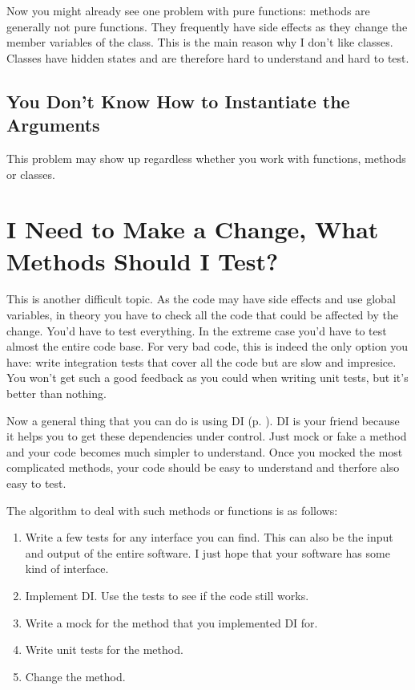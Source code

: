 Now you might already see one problem with pure functions: methods are generally not pure functions. They frequently have side effects as they change the member variables of the class. This is the main reason why I don't like classes. Classes have hidden states and are therefore hard to understand and hard to test.

\section{You Don't Know How to Instantiate the Arguments}

This problem may show up regardless whether you work with functions, methods or classes. 

\chapter{I Need to Make a Change, What Methods Should I Test?}

This is another difficult topic. As the code may have side effects and use global variables, in theory you have to check all the code that could be affected by the change. You'd have to test everything. In the extreme case you'd have to test almost the entire code base. For very bad code, this is indeed the only option you have: write integration tests that cover all the code but are slow and impresice. You won't get such a good feedback as you could when writing unit tests, but it's better than nothing.

Now a general thing that you can do is using DI (p. \pageref{sec:dependency_injection}). DI is your friend because it helps you to get these dependencies under control. Just mock or fake a method and your code becomes much simpler to understand. Once you mocked the most complicated methods, your code should be easy to understand and therfore also easy to test.

The algorithm to deal with such methods or functions is as follows:
\begin{enumerate}
    \item Write a few tests for any interface you can find. This can also be the input and output of the entire software. I just hope that your software has some kind of interface.
    \item Implement DI. Use the tests to see if the code still works.
    \item Write a mock for the method that you implemented DI for.
    \item Write unit tests for the method.
    \item Change the method.
\end{enumerate}


